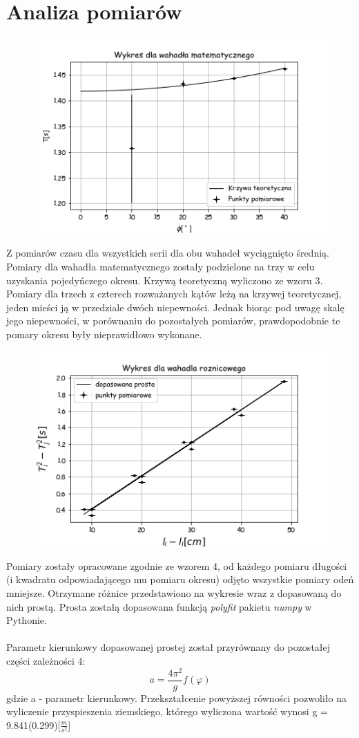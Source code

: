 \documentclass[a4paper,10pt]{article}
\begin{document}
\section{Analiza pomiarów}
\begin{figure}[H]
    \includegraphics{./Wykres_matematyczne.png}
    \caption{}
    \label{}
\end{figure}
Z pomiarów czasu dla wszystkich serii dla obu wahadeł wyciągnięto średnią. Pomiary dla wahadła matematycznego zostały podzielone na trzy w celu uzyskania pojedyńczego okresu. Krzywą teoretyczną wyliczono ze wzoru 3. Pomiary dla trzech z czterech rozważanych kątów leżą na krzywej teoretycznej, jeden mieści ją w przedziale dwóch niepewności.
Jednak biorąc pod uwagę skalę jego niepewności, w porównaniu do pozostałych pomiarów, prawdopodobnie te pomary okresu były nieprawidłowo wykonane.
\begin{figure}[H]
    \includegraphics{./Wykres_roznicowe.png}
    \caption{}
    \label{}
\end{figure}
Pomiary zostały opracowane zgodnie ze wzorem 4, od każdego pomiaru długości (i kwadratu odpowiadającego mu pomiaru okresu) odjęto wszystkie pomiary odeń mniejsze. Otrzymane różnice przedstawiono na wykresie wraz z dopasowaną do nich prostą. Prosta zostałą dopasowana funkcją \emph{polyfit} pakietu \emph{numpy} 
w Pythonie.\\
\\
Parametr kierunkowy dopasowanej prostej został przyrównany do pozostałej części zależności 4:
\begin{equation}
a = \frac{4 \pi^2}{g} f(\varphi)
\end{equation}
gdzie a - parametr kierunkowy. Przekształcenie powyższej równości pozwoliło na wyliczenie przyspieszenia ziemskiego, którego wyliczona wartość wynosi g = 9.841(0.299)[$\frac{m}{s^2}$]
\end{document}
